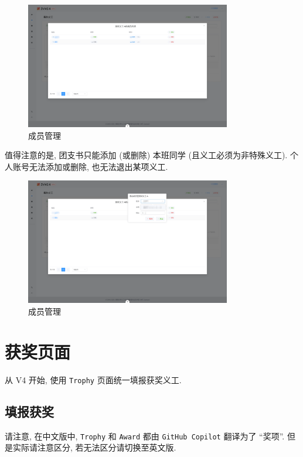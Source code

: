\documentclass{article}
\begin{document}
\begin{figure}[H]
  \centering
  \includegraphics[width=0.8\textwidth]{../assets/image-20240303164326424.png}
  \caption{成员管理}
  \label{fig:volunteer-member-dialog}
\end{figure}

值得注意的是, 团支书只能添加 (或删除) 本班同学 (且义工必须为非特殊义工). 个人账号无法添加或删除, 也无法退出某项义工.

\begin{figure}[H]
  \centering
  \includegraphics[width=0.8\textwidth]{../assets/image-20240303164501549.png}
  \caption{成员管理}
  \label{fig:volunteer-member-dialog-error}
\end{figure}

\section{获奖页面}

从 V4 开始, 使用 \texttt{Trophy} 页面统一填报获奖义工.

\subsection{填报获奖}

\begin{mdframed}
  \fangsong
  请注意, 在中文版中, \texttt{Trophy} 和 \texttt{Award} 都由 \texttt{GitHub Copilot} 翻译为了 ``奖项''. 但是实际请注意区分, 若无法区分请切换至英文版.
\end{mdframed}
\end{document}
